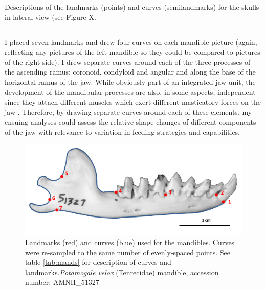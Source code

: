 \begin{table}[!htb]
\caption[Skulls: lateral landmarks]
		{Descriptions of the landmarks (points) and curves (semilandmarks) for the skulls in lateral view (see Figure X.} 

\label{tab:sklat}
\end{table}

\newpage
\subsection{}
	I placed seven landmarks and drew four curves on each mandible picture (again, reflecting any pictures of the left mandible so they could be compared to pictures of the right side). I drew separate curves around each of the three processes of the ascending ramus; coronoid, condyloid and angular and along the base of the horizontal ramus of the jaw. While obviously part of an integrated jaw unit, the development of the mandibular processes are also, in some aspects, independent since they attach different muscles which exert different masticatory forces on the jaw \citep{Barrow2008}. Therefore, by drawing separate curves around each of these elements, my ensuing analyses could assess the relative shape changes of different components of the jaw with relevance to variation in feeding strategies and capabilities.
	
	\newpage %

\begin{figure}[!htb]
	\centering
	\includegraphics[width=1\linewidth]{Methods/figures/AMNH_51327_landmarksdiagram.png}
	\caption[Mandibles: landmarks]
			{Landmarks (red) and curves (blue) used for the mandibles. Curves were re-sampled to the same number of evenly-spaced points. See table \ref{tab:mands} for description of curves and landmarks.\textit{Potamogale velox} (Tenrecidae) mandible, accession number: AMNH\_51327}
	\label{fig:mands_landmarks}
\end{figure}

